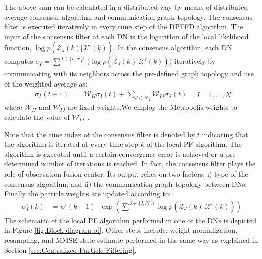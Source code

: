\documentclass[10pt,twocolumn,twoside]{IEEEtran}
\begin{document}
The above sum can be calculated in a distributed way by means of distributed
average consensus algorithm \cite{xiao2004fast,xiao2005scheme} and
communication graph topology. The consensus filter is executed iteratively
in every time step of the DPFFD algorithm. The input of the consensus
filter at each DN is the logarithm of the local likelihood function,
$\log p(\mathcal{Z}_{J}(k)|\mathcal{X}^{i}(k))$. In the consensus
algorithm, each DN computes $\sigma_{I}=\sum^{J\in\{I,\mathcal{N}_{I}\}}\Big(\log p(\mathcal{Z}_{J}(k)|\mathcal{X}^{i}(k))\Big)$
iteratively by communicating with its neighbors across the pre-defined
graph topology and use of the weighted average as:
\begin{equation}
\begin{aligned}\sigma_{I}(t+1) & =\mathcal{W}_{II}\sigma_{I}(t)+\sum_{J\in\mathcal{N}_{I}}\mathcal{W}_{IJ}\sigma_{J}(t)\end{aligned}
\quad I=1,\ldots,N\label{eq:consensus algorithm}
\end{equation}
\noindent where $\mathcal{W}_{II}$ and $\mathcal{W}_{IJ}$ are fixed
weights.We employ the Metropolis weights to calculate the value of
$\mathcal{W}_{IJ}$ \cite{xiao2005scheme,xiao2004fast}. 

Note that the time index of the consensus filter is denoted
by $t$ indicating that the algorithm is iterated at every time step
$k$ of the local PF algorithm. The algorithm is executed until a
certain convergence error is achieved or a pre-determined number of
iterations is reached. In fact, the consensus filter plays the role
of observation fusion center. Its output relies on two factors: i)
type of the consensus algorithm; and ii) the communication graph topology
between DNs. Finally the particle weights are updated according to:
\begin{equation}
\begin{aligned}w_{I}^{i}(k) & =w^{i}(k-1)\cdot\exp\left(\sum^{J\in\{I,\mathcal{N}_{I}\}}\log p(\mathcal{Z}_{J}(k)|\mathcal{X}^{i}(k))\right)\end{aligned}
\label{eq:global weight update}
\end{equation}
The schematic of the local PF algorithm performed in one of the DNs
is depicted in Figure \ref{fig:Block-diagram-of}. Other steps include:
weight normalization, resampling, and MMSE state estimate performed
in the same way as explained in Section \ref{sec:Centralized-Particle-Filtering}.
\end{document}
